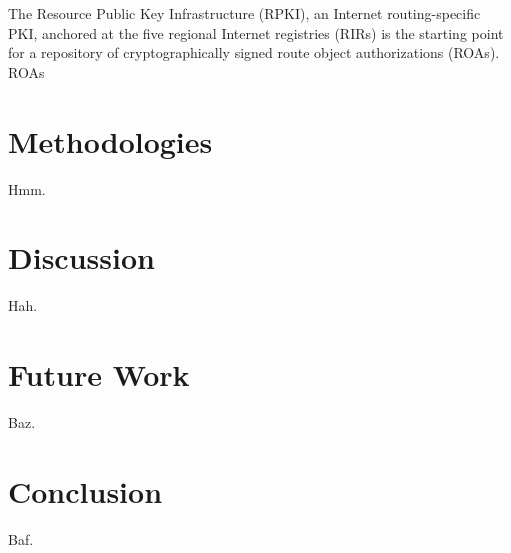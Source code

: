 \documentclass[sigconf]{acmart}
\begin{document}
The Resource Public Key
Infrastructure (RPKI), an Internet routing-specific PKI, anchored at the
five regional Internet registries (RIRs) is the starting point for a
repository of cryptographically signed route object authorizations
(ROAs).  ROAs

\section{Methodologies}\label{sec:Methodologies}

Hmm.

\section{Discussion}\label{sec:Discussion}

Hah.

\section{Future Work}\label{sec:Future Work}

Baz.

\section{Conclusion}\label{sec:Conclusion}

Baf.


\end{document}
